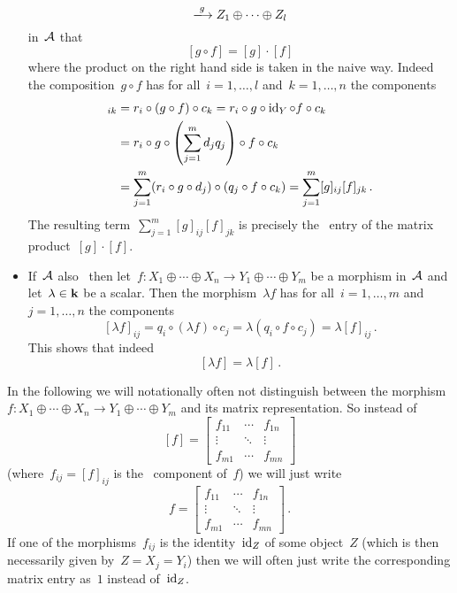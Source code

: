 \begin{remark*}
\begin{itemize}
\[        \xlongto{g}
          Z_1 \oplus \dotsb \oplus Z_l
      \]
      in~$\mathcal{A}$ that
      \[
          [g \circ f]
        = [g] \cdot [f]
      \]
      where the product on the right hand side is taken in the naive way.
      Indeed the composition~$g \circ f$ has for all~$i = 1, \dotsc, l$ and~$k = 1, \dotsc, n$ the components
      \begin{align*}
            [g \circ f]_{ik}
        &=  r_i \circ (g \circ f) \circ c_k
         =  r_i \circ g \circ \id_Y \circ f \circ c_k \\
        &=  r_i \circ g \circ \left( \sum_{j=1}^m d_j q_j \right) \circ f \circ c_k \\
        &=  \sum_{j=1}^m (r_i \circ g \circ d_j) \circ (q_j \circ f \circ c_k)
         =  \sum_{j=1}^m [g]_{ij} [f]_{jk} \,.
      \end{align*}
      The resulting term~$\sum_{j=1}^m [g]_{ij} [f]_{jk}$ is precisely the~ entry of the matrix product~$[g] \cdot [f]$.
    \item
      If~$\mathcal{A}$ also~{\preklin} then let~$f \colon X_1 \oplus \dotsb \oplus X_n \to Y_1 \oplus \dotsb \oplus Y_m$ be a morphism in~$\mathcal{A}$ and let~$\lambda \in \mathbf{k}$ be a scalar.
      Then the morphism~$\lambda f$ has for all~$i = 1, \dotsc, m$ and~$j = 1, \dotsc, n$ the components
      \[
          [\lambda f]_{ij}
        = q_i \circ (\lambda f) \circ c_j
        = \lambda (q_i \circ f \circ c_j)
        = \lambda [f]_{ij} \,.
      \]
      This shows that indeed
      \[
          [\lambda f]
        = \lambda [f] \,.
      \]
  \end{itemize}
  
  In the following we will notationally often not distinguish between the morphism~$f \colon X_1 \oplus \dotsb \oplus X_n \to Y_1 \oplus \dotsb \oplus Y_m$ and its matrix representation.
  So instead of
  \[
      [f]
    = \begin{bmatrix}
        f_{11}  & \cdots  & f_{1n}  \\
        \vdots  & \ddots  & \vdots  \\
        f_{m1}  & \cdots  & f_{mn}
      \end{bmatrix}
  \]
  (where~$f_{ij} = [f]_{ij}$ is the~ component of~$f$) we will just write
  \[
      f
    = \begin{bmatrix}
        f_{11}  & \cdots  & f_{1n}  \\
        \vdots  & \ddots  & \vdots  \\
        f_{m1}  & \cdots  & f_{mn}
      \end{bmatrix} \,.
  \]
  If one of the morphisms~$f_{ij}$ is the identity~$\operatorname{id}_Z$ of some object~$Z$ (which is then necessarily given by~$Z = X_j = Y_i$) then we will often just write the corresponding matrix entry as~$1$ instead of~$\operatorname{id}_Z$.
  

\end{remark*}
